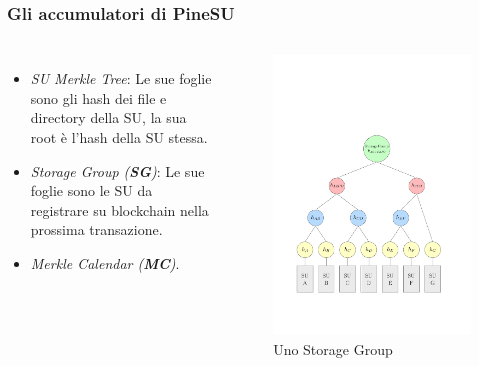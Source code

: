 \documentclass{beamer}
\begin{document}
\begin{frame}
	\frametitle{Gli accumulatori di PineSU}
	\begin{columns}
		\begin{itemize}[<+->]
			\item \emph{SU Merkle Tree}: Le sue foglie sono gli hash dei file e directory della SU, la sua root è l'hash della SU stessa. 
			\item \emph{Storage Group (\textbf{SG})}: Le sue foglie sono le SU da registrare su blockchain nella prossima transazione. 
			\item \emph{Merkle Calendar (\textbf{MC})}.
		\end{itemize}
		\centering
		\begin{figure}
			\includegraphics[width=\textwidth]{figures/sg1.pdf}
			\caption{Uno Storage Group}
		\end{figure} 
	\end{columns}
\end{frame}
\end{document}
